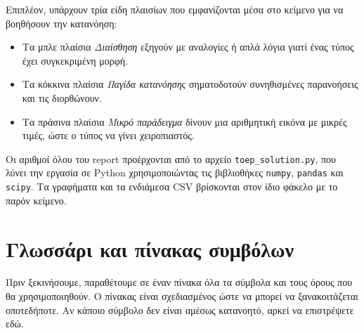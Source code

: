 \documentclass[12pt,a4paper]{article}
\newcommand{\code}[1]{\texttt{\textenglish{#1}}}
\begin{document}
Επιπλέον, υπάρχουν τρία είδη πλαισίων που εμφανίζονται μέσα στο κείμενο για
να βοηθήσουν την κατανόηση:

\begin{itemize}[leftmargin=2.2em]
    \item Τα μπλε πλαίσια \emph{Διαίσθηση} εξηγούν με αναλογίες ή απλά λόγια
    γιατί ένας τύπος έχει συγκεκριμένη μορφή.
    \item Τα κόκκινα πλαίσια \emph{Παγίδα κατανόησης} σηματοδοτούν συνηθισμένες
    παρανοήσεις και τις διορθώνουν.
    \item Τα πράσινα πλαίσια \emph{Μικρό παράδειγμα} δίνουν μια αριθμητική
    εικόνα με μικρές τιμές, ώστε ο τύπος να γίνει χειροπιαστός.
\end{itemize}

Οι αριθμοί όλου του report προέρχονται από το αρχείο \code{toep\_solution.py},
που λύνει την εργασία σε Python χρησιμοποιώντας τις βιβλιοθήκες \code{numpy},
\code{pandas} και \code{scipy}. Τα γραφήματα και τα ενδιάμεσα CSV βρίσκονται
στον ίδιο φάκελο με το παρόν κείμενο.

\newpage

\section*{Γλωσσάρι και πίνακας συμβόλων}

Πριν ξεκινήσουμε, παραθέτουμε σε έναν πίνακα όλα τα σύμβολα και τους όρους
που θα χρησιμοποιηθούν. Ο πίνακας είναι σχεδιασμένος ώστε να μπορεί να
ξανακοιτάζεται οποτεδήποτε. Αν κάποιο σύμβολο δεν είναι αμέσως κατανοητό,
αρκεί να επιστρέψετε εδώ.
\end{document}
